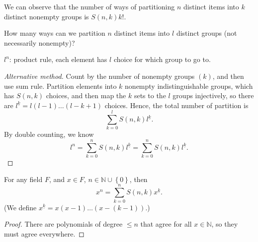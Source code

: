 We can observe that the number of ways of partitioning \(n\) distinct items into \(k\) distinct nonempty groups is \(S(n, k) k!\). 

\begin{question}
    How many ways can we partition \(n\) distinct items into \(l\) distinct groups (not necessarily nonempty)?
\end{question}
\begin{answer}
    \(l^n\): product rule, each element has \(l\) choice for which group to go to.   
\end{answer}
\begin{proof}[Alternative method]
    Count by the number of nonempty groups \((k)\), and then use sum rule. Partition elements into \(k\) nonempty indistinguishable groups, which has \(S(n, k)\) choices, and then map the \(k\) sets to the \(l\) groups injectively, so there are \(l^{\underline{k}} = l(l - 1) \dots (l - k + 1)\) choices. Hence, the total number of partition is 
    \[
        \sum_{k=0}^l S(n, k) l^{\underline{k}}.
    \]
        By double counting, we know 
    \[
        l^n = \sum_{k=0}^n S(n, k) l^{\underline{k}} = \sum_{k=0}^n S(n, k) l^{\underline{k}}. 
    \]     
\end{proof}
\begin{proposition} \label{prop: x^n is sum S(n,k)x^underline(k) is true for any field}
    For any field \(F\), and \(x \in F\), \(n \in \mathbb{N} \cup \left\{ 0 \right\} \), then 
    \[
        x^n = \sum_{k=0}^n S(n, k) x^{\underline{k}}. 
    \]   
    (We define \(x^{\underline{k}} = x(x-1) \dots (x - (k-1))\).)
\end{proposition}

\begin{proof}
    There are polynomials of degree \(\le n\) that agree for all \(x \in \mathbb{N} \), so they must agree everywhere.  
\end{proof}

